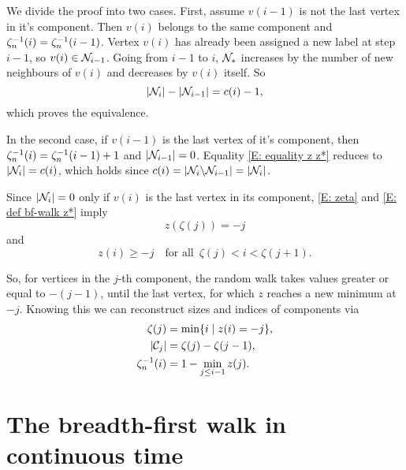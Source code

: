 We divide the proof into two cases.
First, assume $v(i-1)$ is not the last vertex in it's component.
Then $v(i)$ belongs to the same component and
$\zeta^{-1}_n(i) = \zeta^{-1}_n(i-1)$.
Vertex $v(i)$ has already been assigned a new label at step $i-1$,
so $v(i) \in \mathcal{N}_{i-1}$.
Going from $i-1$ to $i$,
$\mathcal{N}_{*}$ increases by the number of new neighbours of $v(i)$
and decreases by $v(i)$ itself.
So
\begin{equation}
|\mathcal{N}_{i}| - |\mathcal{N}_{i-1}| = c(i) - 1,
\end{equation}
which proves the equivalence.

In the second case, if $v(i-1)$ is the last vertex of it's component,
then $\zeta^{-1}_n(i) = \zeta^{-1}_n(i-1) + 1$
and $|\mathcal{N}_{i-1}| = 0$.
Equality \eqref{E: equality z z*} reduces to
$ |\mathcal{N}_{i}| = c(i)$,
which holds since
$c(i) = |\mathcal{N}_{i} \backslash \mathcal{N}_{i-1}| = |\mathcal{N}_{i}|$.

Since $|\mathcal{N}_{i}| = 0$ only if $v(i)$ is the last vertex in its component,
\eqref{E: zeta} and \eqref{E: def bf-walk z*} imply
\begin{equation}
	z(\zeta (j)) = -j
\end{equation}
and 
\begin{equation}
	z(i) \geq -j \quad \text{for all} \enspace \zeta(j) < i < \zeta(j+1).
\end{equation}

So, for vertices in the $j$-th component,
the random walk takes values greater or equal to $-(j-1)$,
until the last vertex, for which $z$ reaches a new minimum at $-j$.
Knowing this we can reconstruct sizes and indices of components via
\begin{align}
\zeta(j) &= \min \{ i \; | \; z(i) = -j \}, \label{E: zeta(j) = min(i)} \\
|\mathcal{C}_{j}| &= \zeta(j) - \zeta(j-1), \label{E: C(j) = zeta - zeta} \\
\zeta^{-1}_n(i) &= 1 - \min_{j \leq i-1}z(j). \label{E: zeta-1(i) = 1 - min(j)}
\end{align}


\section{The breadth-first walk in continuous time}


